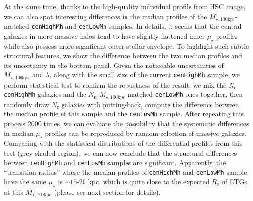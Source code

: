 \documentclass{emulateapj}
\def\rbcg{\texttt{cenHighMh}}
\def\nbcg{\texttt{cenLowMh}}
\def\mtot{{$M_{\star,100\mathrm{kpc}}$}}
\def\mden{{$\mu_{\star}$}}
\newcommand{\update}[1]{\textcolor{Bittersweet}{#1}}
\begin{document}
\begin{CJK*}{UTF8}{gbsn}
    At the same time, thanks to the high-quality individual profile from HSC image, 
    we can also spot interesting differences in the median profiles of the 
    \mtot{}-matched \rbcg{} and \nbcg{} samples.  
    In details, it seems that the central galaxies in more massive halos tend to 
    have slightly flattened inner \mden{} profiles while also possess more significant 
    outer stellar envelope.   
    To highlight such subtle structural features, we show the difference between 
    the two median profiles and its uncertainty in the bottom panel. 
    Given the noticeable uncertainties of \mtot{} and $\lambda$, along with the 
    small size of the current \rbcg{} sample, we perform statistical test to confirm 
    the robustness of the result: we mix the $N_{\mathrm{r}}$ \rbcg{} galaxies and 
    the $N_{\mathrm{n}}$ \mtot{}-matched \nbcg{} ones together, then randomly draw 
    $N_{\mathrm{r}}$ galaxies with putting-back, compute the difference between the 
    median profile of this sample and the \nbcg{} sample. 
    \update{
    After repeating this process 2000 times, we can evaluate the possibility that 
    the systematic differences in median \mden{} profiles can be reproduced by random 
    selection of massive galaxies.
    Comparing with the statistical distributions of the differential profiles from 
    this test (grey shaded region), we can now conclude that the structural 
    differences between \rbcg{} and \nbcg{} samples are significant.}
    Apparently, the ``transition radius'' where the median profiles of \rbcg{} 
    and \nbcg{} sample have the same \mden{} is $\sim 15$-20 kpc, which is quite 
    close to the expected $R_{\mathrm{e}}$ of ETGs at this \mtot{} (please see 
    next section for details).
       

\end{CJK*}
\end{document}
